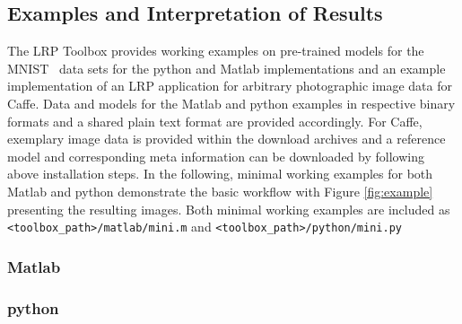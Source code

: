 \documentclass[a4wide]{article}
\begin{document}
\subsection*{Examples and Interpretation of Results}
The LRP Toolbox provides working examples on pre-trained models for the MNIST~\cite{lecun1998mnist} data sets for the python and Matlab implementations and an example implementation of an LRP application for arbitrary photographic image data for Caffe. Data and models for the Matlab and python examples in respective binary formats and a shared plain text format are provided accordingly. For Caffe, exemplary image data is provided within the download archives and a  reference model and corresponding meta information can be downloaded by following above installation steps. 
In the following, minimal working examples for both Matlab and python demonstrate the basic workflow with Figure \ref{fig:example} presenting the resulting images. Both minimal working examples are included as \texttt{<toolbox\_path>/matlab/mini.m} and \texttt{<toolbox\_path>/python/mini.py} \\
\begin{minipage}[t]{.5\textwidth}
\subsubsection*{\vphantom{python} Matlab}

\end{minipage}
\begin{minipage}[t]{.5\textwidth}
\subsubsection*{python \vphantom{Matlab}}

\end{minipage}
\end{document}
